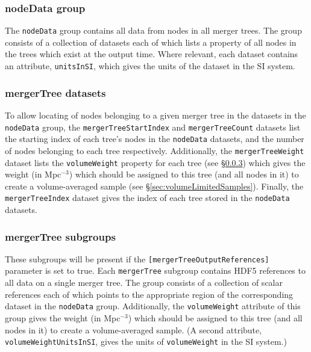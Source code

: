 \subsubsection{nodeData group}\label{sec:nodeDataGroup}

The {\tt nodeData} group contains all data from nodes in all merger trees. The group consists of a collection of datasets each of which lists a property of all nodes in the trees which exist at the output time. Where relevant, each dataset contains an attribute, {\tt unitsInSI}, which gives the units of the dataset in the SI system.

\subsubsection{mergerTree datasets}\label{sec:mergerTreeDatasets}

To allow locating of nodes belonging to a given merger tree in the datasets in the {\tt nodeData} group, the {\tt mergerTreeStartIndex} and {\tt mergerTreeCount} datasets list the starting index of each tree's nodes in the {\tt nodeData} datasets, and the number of nodes belonging to each tree respectively. Additionally, the {\tt mergerTreeWeight} dataset lists the {\tt volumeWeight} property for each tree (see \S\ref{sec:mergerTreeSubgroups}) which gives the weight (in Mpc$^{-3}$) which should be assigned to this tree (and all nodes in it) to create a volume-averaged sample (see \S\ref{sec:volumeLimitedSamples}). Finally, the {\tt mergerTreeIndex} dataset gives the index of each tree stored in the {\tt nodeData} datasets.

\subsubsection{mergerTree subgroups}\label{sec:mergerTreeSubgroups}

These subgroups will be present if the {\tt [mergerTreeOutputReferences]} parameter is set to true. Each {\tt mergerTree} subgroup contains HDF5 references to all data on a single merger tree. The group consists of a collection of scalar references each of which points to the appropriate region of the corresponding dataset in the {\tt nodeData} group. Additionally, the {\tt volumeWeight} attribute of this group gives the weight (in Mpc$^{-3}$) which should be assigned to this tree (and all nodes in it) to create a volume-averaged sample. (A second attribute, {\tt volumeWeightUnitsInSI}, gives the units of {\tt volumeWeight} in the SI system.)

